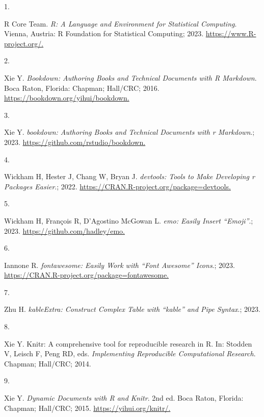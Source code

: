 \documentclass[
]{book}
\newlength{\cslhangindent}
\newlength{\csllabelwidth}
\newlength{\cslentryspacingunit} %
\newenvironment{CSLReferences}[2] %
 {%
  \setlength{\parindent}{0pt}
  \ifodd #1
  \let\oldpar\par
  \def\par{\hangindent=\cslhangindent\oldpar}
  \fi
  \setlength{\parskip}{#2\cslentryspacingunit}
 }%
 {}
\newcommand{\CSLLeftMargin}[1]{\parbox[t]{\csllabelwidth}{#1}}
\newcommand{\CSLRightInline}[1]{\parbox[t]{\linewidth - \csllabelwidth}{#1}\break}
\begin{document}
\hypertarget{refs}{}
\begin{CSLReferences}{0}{0}
\leavevmode{}%
\CSLLeftMargin{1. }%
\CSLRightInline{R Core Team. \emph{{R}: A Language and Environment for Statistical Computing}. Vienna, Austria: R Foundation for Statistical Computing; 2023. \href{https://www.R-project.org/}{https://www.R-project.org/.}}

\leavevmode{}%
\CSLLeftMargin{2. }%
\CSLRightInline{Xie Y. \emph{Bookdown: Authoring Books and Technical Documents with {R} Markdown}. Boca Raton, Florida: Chapman; Hall/CRC; 2016. \href{https://bookdown.org/yihui/bookdown}{https://bookdown.org/yihui/bookdown.}}

\leavevmode{}%
\CSLLeftMargin{3. }%
\CSLRightInline{Xie Y. \emph{{bookdown}: Authoring Books and Technical Documents with r Markdown}.; 2023. \href{https://github.com/rstudio/bookdown}{https://github.com/rstudio/bookdown.}}

\leavevmode{}%
\CSLLeftMargin{4. }%
\CSLRightInline{Wickham H, Hester J, Chang W, Bryan J. \emph{{devtools}: Tools to Make Developing r Packages Easier}.; 2022. \href{https://CRAN.R-project.org/package=devtools}{https://CRAN.R-project.org/package=devtools.}}

\leavevmode{}%
\CSLLeftMargin{5. }%
\CSLRightInline{Wickham H, François R, D'Agostino McGowan L. \emph{{emo}: Easily Insert {``{Emoji}''}}.; 2023. \href{https://github.com/hadley/emo}{https://github.com/hadley/emo.}}

\leavevmode{}%
\CSLLeftMargin{6. }%
\CSLRightInline{Iannone R. \emph{{fontawesome}: Easily Work with {``{Font Awesome}''} Icons}.; 2023. \href{https://CRAN.R-project.org/package=fontawesome}{https://CRAN.R-project.org/package=fontawesome.}}

\leavevmode{}%
\CSLLeftMargin{7. }%
\CSLRightInline{Zhu H. \emph{{kableExtra}: Construct Complex Table with {``{kable}''} and Pipe Syntax}.; 2023.}

\leavevmode{}%
\CSLLeftMargin{8. }%
\CSLRightInline{Xie Y. Knitr: A comprehensive tool for reproducible research in {R}. In: Stodden V, Leisch F, Peng RD, eds. \emph{Implementing Reproducible Computational Research}. Chapman; Hall/CRC; 2014.}

\leavevmode{}%
\CSLLeftMargin{9. }%
\CSLRightInline{Xie Y. \emph{Dynamic Documents with {R} and Knitr}. 2nd ed. Boca Raton, Florida: Chapman; Hall/CRC; 2015. \href{https://yihui.org/knitr/}{https://yihui.org/knitr/.}}


\end{CSLReferences}
\end{document}
